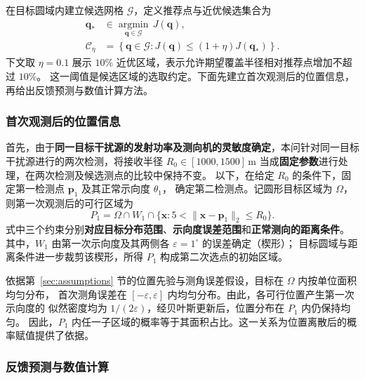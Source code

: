 \documentclass[UTF8,a4paper,12pt]{ctexart}
\begin{document}
在目标圆域内建立候选网格 $\mathcal G$，定义推荐点与近优候选集合为
\begin{equation}
  \begin{aligned}
    \boldsymbol q_*&\in\underset{\boldsymbol q\in\mathcal G}{\operatorname{argmin}}\,J(\boldsymbol q),\\
    \mathcal C_\eta&=\left\{\boldsymbol q\in\mathcal G:
    J(\boldsymbol q)\leq(1+\eta)J(\boldsymbol q_*)\right\}.
  \end{aligned}
  \label{eq:q2-candidate-set}
\end{equation}
下文取 $\eta=0.1$ 展示 $10\%$ 近优区域，表示允许期望覆盖半径相对推荐点增加不超过 $10\%$。
这一阈值是候选区域的选取约定。下面先建立首次观测后的位置信息，再给出反馈预测与数值计算方法。

\subsubsection{首次观测后的位置信息}
\label{sec:q2-bayes}

首先，由于\textbf{同一目标干扰源的发射功率及测向机的灵敏度确定}，本问针对同一目标干扰源进行的两次检测，将接收半径
$R_0\in[1000,1500]\,\mathrm m$ 当成\textbf{固定参数}进行处理，在两次检测及候选测点的比较中保持不变。
以下，在给定 $R_0$ 的条件下，固定第一检测点 $\boldsymbol p_1$ 及其正常示向度 $\theta_1$，
确定第二检测点。记圆形目标区域为 $\Omega$，则第一次观测后的可行区域为
\begin{equation}
  P_1=\Omega\cap W_1\cap
  \{\boldsymbol x:5<\|\boldsymbol x-\boldsymbol p_1\|_2\leq R_0\}.
  \label{eq:q2-first-region}
\end{equation}
式中三个约束分别\textbf{对应目标分布范围}、\textbf{示向度误差范围}和\textbf{正常测向的距离条件}。
其中，$W_1$ 由第一次示向度及其两侧各 $\varepsilon=1^\circ$ 的误差确定（楔形）；
目标圆域与距离条件进一步裁剪该楔形，所得 $P_1$ 构成第二次选点的初始区域。

依据第~\ref{sec:assumptions} 节的位置先验与测角误差假设，目标在 $\Omega$ 内按单位面积均匀分布，
首次测角误差在 $[-\varepsilon,\varepsilon]$ 内均匀分布。由此，各可行位置产生第一次示向度的
似然密度均为 $1/(2\varepsilon)$，经贝叶斯更新\cite{gelman2013bayesian}后，位置分布在 $P_1$ 内仍保持均匀。
因此，$P_1$ 内任一子区域的概率等于其面积占比。这一关系为位置离散后的概率赋值提供了依据。

\subsubsection{反馈预测与数值计算}
\label{sec:q2-numerics}
\end{document}
